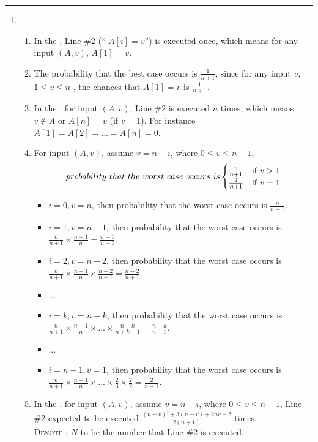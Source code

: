 \documentclass[11pt,twoside]{article}
\begin{document}
\rule{\textwidth}{.5pt}

\begin{enumerate}[leftmargin=0pt]

\item	
		\begin{enumerate}[topsep=0pt]
		\item	In the , Line \#2 (`` $A[i] = v$'') is executed once, which
			means for any input $(A, v)$, $A[1] = v$.
		\item	The probability that the best case occurs is $\frac{1}{n+1} $,  since for any input
			$v$,  $1\le v\le n$ , the chances that  $A[1] = v$ is $\frac{1}{n+1} $.
		\item	In the , for input $(A, v)$, Line \#2 is executed $n$ times, which means 
			$v \notin A$ or $A[n] = v$ (if $v =1$). For instance $A[1] = A[2] =...=A[n] = 0$.
		\item	For input $(A, v)$, assume $v = n-i$, where  $0\le v\le n-1$, 
		\[
		 	probability \ that \ the \ worst \ case \ occurs \ is \left\{\def\arraystretch{1.2}%
  			\begin{array}{@{}c@{\quad}l@{}}
   					 \frac {v}{n+1}&  \text{if $v > 1$}\\
   					 \frac {2}{n+1} & \text{if $v = 1$}\\
 			 \end{array}\right.
		\]
			\begin{itemize} [label={}]
				\item	 $i = 0, v = n$, then probability that the worst case occurs is
					$\frac {n}{n+1}$.
				\item	 $i = 1, v = n-1$, then probability that the worst case occurs is
					$\frac {n}{n+1} \times \frac {n-1}{n} = \frac {n-1}{n+1}$.
				\item	 $i = 2, v = n-2$, then probability that the worst case occurs is
					$\frac {n}{n+1} \times \frac {n-1}{n} \times  \frac {n-2}{n-1} = \frac {n-2}{n+1}$.
				\item ...
				\item	 $i = k, v = n-k$, then probability that the worst case occurs is
					$\frac {n}{n+1} \times \frac {n-1}{n} \times ... \times \frac {n-k}{n+k-1} = \frac{n-k}{n+1}$.
				\item ...
				\item	 $i = n-1, v = 1$, then probability that the worst case occurs is
					$\frac {n}{n+1} \times \frac {n-1}{n} \times ... \times \frac {2}{3} \times \frac{2}{2}= 
					\frac{2}{n+1}$.
			\end{itemize}
		\item	In the , for input $(A, v)$, assume $v = n-i$, where 
			$0\le v\le n-1$, Line \#2 expected to be executed $\frac{(n-v)^2 + 3(n-v) +2nv +2}{2(n+1)}$ 				times.\\
			\textsc{Denote : } $N$ to be the number that Line \#2 is executed.\\


\end{enumerate}
\end{enumerate}
\end{document}

